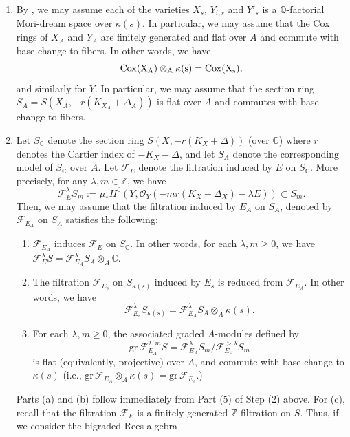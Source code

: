\documentclass[11pt,reqno]{amsart}
\newcommand{\C}{\mathbb{C}}
\newcommand{\Q}{\mathbb{Q}}
\newcommand{\Z}{\mathbb{Z}}
\newcommand{\cO}{\mathcal{O}}
\numberwithin{equation}{section}
\theoremstyle{definition}
\begin{document}
\begin{enumerate}
    \item By \cite[Lemma~2.22]{GongyoOkawaSannaiTakagiCoxRings}, we may assume each of the varieties $X_s$, $Y_{i,s}$ and $Y'_s$ is a $\Q$-factorial Mori-dream space over $\kappa(s)$. In particular, we may assume that the Cox rings of $X_A$ and $Y_A$ are finitely generated and flat over $A$ and commute with base-change to fibers. In other words, we have
    \[ \rm{Cox} (X_A) \otimes _A \kappa(s) = \rm{Cox}(X_s),  \]
    and similarly for $Y$. In particular, we may assume that the section ring $S_A = S(X_A, -r(K_{X_A} + \Delta_A))$ is flat over $A$ and commutes with base-change to fibers.

    \item Let $S_\C$ denote the section ring $S(X, -r(K_X + \Delta))$ (over $\C$) where $r$ denotes the Cartier index of $-K_X - \Delta$, and let $S_A$ denote the corresponding model of $S_\C$ over $A$. Let $\mathscr{F} _E$ denote the filtration induced by $E$ on $S_\C$. More precisely, for any $\lambda,m \in \Z$, we have
    \[ \mathscr{F}_E ^\lambda S_m := \mu_*H^0 (Y, \cO_Y (-mr(K_X + \Delta_X) - \lambda E) ) \subset S_m. \]
    Then, we may assume that the filtration induced by $E_A$ on $S_A$, denoted by $\mathscr{F}_{E_A}$ on $S_A$ satisfies the following:
    \begin{enumerate}
        \item [(a)] $\mathscr{F}_{E_A}$ induces $\mathscr{F}_E$ on $S_\C$. In other words, for each $\lambda,m \geq 0$, we have $ \mathscr{F}_E ^\lambda S =  \mathscr{F}_{E_A} ^{\lambda} S_A \otimes_A \C. $
        \item [(b)] The filtration $\mathscr{F}_{E_s}$ on $S_{\kappa(s)}$ induced by $E_s$ is reduced from $\mathscr{F}_{E_A}$. In other words, we have
        \[ \mathscr{F}_{E_s} ^\lambda S_{\kappa(s)} =  \mathscr{F}_{E_A} ^{\lambda} S_A \otimes_A \kappa(s). \]
        \item [(c)] For each $\lambda, m \geq 0$, the associated graded $A$-modules defined by
\begin{equation}
   \text{gr} \, \mathscr{F}_{E_A} ^{\lambda,m} S = \mathscr{F}_{E_A} ^{\lambda} S_m/ \mathscr{F}_{E_A}  ^{> \lambda} S_m
\end{equation}
is flat (equivalently, projective) over $A$, and commute with base change to $\kappa (s)$ (i.e., $\text{gr} \, \mathscr{F}_{E_A} \otimes _A \kappa(s) = \text{gr} \, \mathscr{F}_{E_s}. $)
    \end{enumerate}
    \medskip
Parts (a) and (b) follow immediately from Part (5) of Step (2) above. For (c), recall that the filtration $\mathscr{F}_{E}$ is a finitely generated $\Z$-filtration on $S$. Thus, if we consider the bigraded Rees algebra

\end{enumerate}
\end{document}
